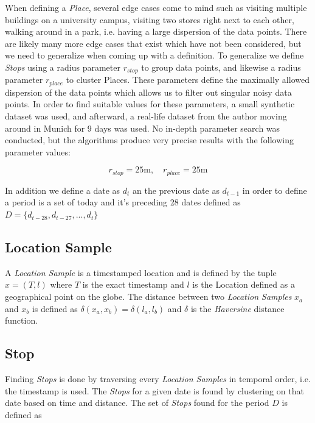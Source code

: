 When defining a \textit{Place}, several edge cases come to mind such as visiting multiple buildings on a university campus, visiting two stores right next to each other, walking around in a park, i.e. having a large dispersion of the data points. There are likely many more edge cases that exist which have not been considered, but we need to generalize when coming up with a definition. To generalize we define \textit{Stops} using a radius parameter $r_{stop}$ to group data points, and likewise a radius parameter $r_{place}$ to cluster Places. These parameters define the maximally allowed dispersion of the data points which allows us to filter out singular noisy data points. In order to find suitable values for these parameters, a small synthetic dataset was used, and afterward, a real-life dataset from the author moving around in Munich for 9 days was used. No in-depth parameter search was conducted, but the algorithms produce very precise results with the following parameter values:

\begin{equation}
\label{eq:stop-place-radius}
r_{stop} = 25 \text{m}, \quad r_{place} = 25 \text{m}
\end{equation}


In addition we define a date as $d_t$ an the previous date as $d_{t-1}$ in order to define a period is a set of today and it's preceding 28 dates defined as $D = \{d_{t-28}, d_{t-27}, ..., d_{t}\}$\\

\subsection{Location Sample}
A \textit{Location Sample} is a timestamped location and is defined by the tuple $x = (T, l)$ where $T$ is the exact timestamp and $l$ is the Location defined as a geographical point on the globe. The distance between two \textit{Location Samples} $x_a$ and $x_b$ is defined as $\delta(x_a, x_b) = \delta(l_a, l_b)$ and $\delta$ is the \textit{Haversine} distance function.

\subsection{Stop}
Finding \textit{Stops} is done by traversing every \textit{Location Samples} in temporal order, i.e. the timestamp is used. The \textit{Stops} for a given date is found by clustering  on that date based on time and distance. The set of \textit{Stops} found for the period $D$ is defined as

